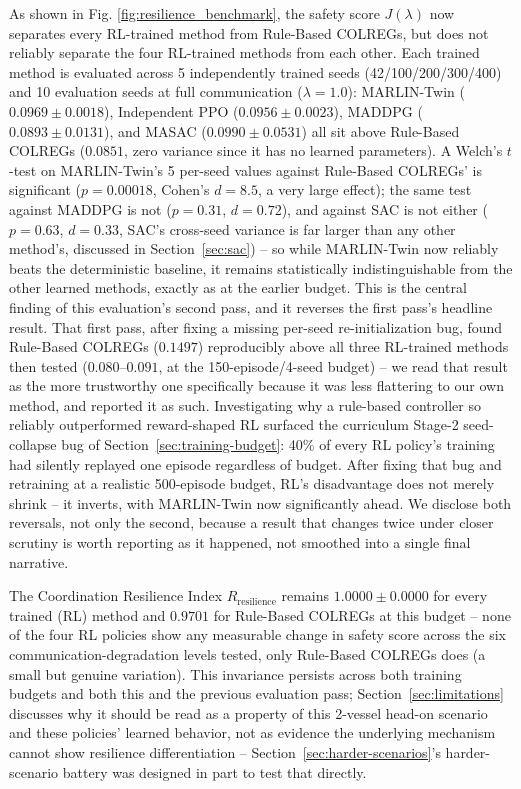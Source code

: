 \documentclass[journal,twocolumn,10pt]{IEEEtran}
\begin{document}
As shown in Fig. \ref{fig:resilience_benchmark}, the safety score $J(\lambda)$ now separates every RL-trained method from Rule-Based COLREGs, but does not reliably separate the four RL-trained methods from each other. Each trained method is evaluated across 5 independently trained seeds (42/100/200/300/400) and 10 evaluation seeds at full communication ($\lambda=1.0$): MARLIN-Twin ($0.0969 \pm 0.0018$), Independent PPO ($0.0956 \pm 0.0023$), MADDPG ($0.0893 \pm 0.0131$), and MASAC ($0.0990 \pm 0.0531$) all sit above Rule-Based COLREGs ($0.0851$, zero variance since it has no learned parameters). A Welch's $t$-test on MARLIN-Twin's 5 per-seed values against Rule-Based COLREGs' is significant ($p=0.00018$, Cohen's $d=8.5$, a very large effect); the same test against MADDPG is not ($p=0.31$, $d=0.72$), and against SAC is not either ($p=0.63$, $d=0.33$, SAC's cross-seed variance is far larger than any other method's, discussed in Section~\ref{sec:sac}) -- so while MARLIN-Twin now reliably beats the deterministic baseline, it remains statistically indistinguishable from the other learned methods, exactly as at the earlier budget. This is the central finding of this evaluation's second pass, and it reverses the first pass's headline result. That first pass, after fixing a missing per-seed re-initialization bug, found Rule-Based COLREGs ($0.1497$) reproducibly above all three RL-trained methods then tested ($0.080$--$0.091$, at the 150-episode/4-seed budget) -- we read that result as the more trustworthy one specifically because it was less flattering to our own method, and reported it as such. Investigating why a rule-based controller so reliably outperformed reward-shaped RL surfaced the curriculum Stage-2 seed-collapse bug of Section~\ref{sec:training-budget}: 40\% of every RL policy's training had silently replayed one episode regardless of budget. After fixing that bug and retraining at a realistic 500-episode budget, RL's disadvantage does not merely shrink -- it inverts, with MARLIN-Twin now significantly ahead. We disclose both reversals, not only the second, because a result that changes twice under closer scrutiny is worth reporting as it happened, not smoothed into a single final narrative.

The Coordination Resilience Index $R_{\text{resilience}}$ remains $1.0000 \pm 0.0000$ for every trained (RL) method and $0.9701$ for Rule-Based COLREGs at this budget -- none of the four RL policies show any measurable change in safety score across the six communication-degradation levels tested, only Rule-Based COLREGs does (a small but genuine variation). This invariance persists across both training budgets and both this and the previous evaluation pass; Section~\ref{sec:limitations} discusses why it should be read as a property of this 2-vessel head-on scenario and these policies' learned behavior, not as evidence the underlying mechanism cannot show resilience differentiation -- Section~\ref{sec:harder-scenarios}'s harder-scenario battery was designed in part to test that directly.
\end{document}
